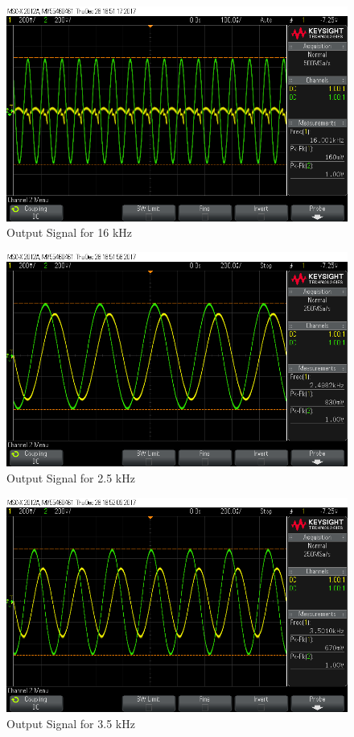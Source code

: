 \documentclass[paper]{IEEEtran}
\begin{document}
\begin{figure}[h!]
	\setlength{\unitlength}{\textwidth}
	\center 
	\includegraphics[width=0.45\unitlength]{lpf_osc2.png}
	\caption{\label{fig:lpfvo1}Output Signal for 16 kHz}
\end{figure} 
	

\begin{figure}[h!]
	\setlength{\unitlength}{\textwidth}
	\center 
	\includegraphics[width=0.45\unitlength]{lpf_osc4.png}
	\caption{\label{fig:lpfvo2}Output Signal for 2.5 kHz}
\end{figure} 
	

\begin{figure}[h!]
	\setlength{\unitlength}{\textwidth}
	\center 
	\includegraphics[width=0.45\unitlength]{lpf_osc5.png}
	\caption{\label{fig:lpfvo2}Output Signal for 3.5 kHz}
\end{figure} 
		
\end{document}
